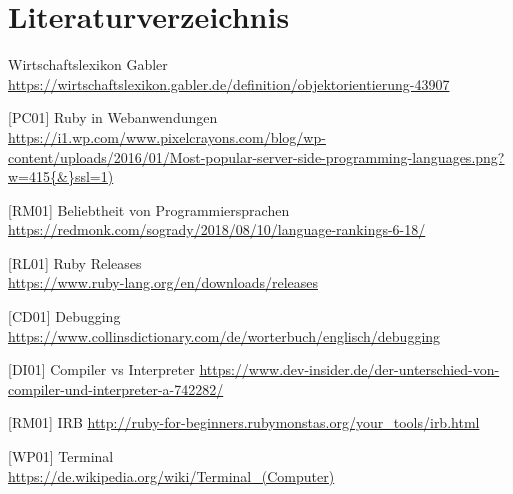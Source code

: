 \documentclass[12pt,DIV=14, version=first, BCOR=10mm,a4paper,twoside,parskip=half-,headsepline,headinclude]{scrartcl}
\begin{document}
\section{Literaturverzeichnis}
\begin{flushleft}
[WL01] Wirtschaftslexikon Gabler
\url {https://wirtschaftslexikon.gabler.de/definition/objektorientierung-43907}


[PC01] Ruby in Webanwendungen
\url {https://i1.wp.com/www.pixelcrayons.com/blog/wp-content/uploads/2016/01/Most-popular-server-side-programming-languages.png?w=415{\&}ssl=1)}


[RM01] Beliebtheit von Programmiersprachen
\url {https://redmonk.com/sogrady/2018/08/10/language-rankings-6-18/}


[RL01] Ruby Releases\\
\url {https://www.ruby-lang.org/en/downloads/releases}

[CD01] Debugging
\url {https://www.collinsdictionary.com/de/worterbuch/englisch/debugging}

[DI01] Compiler vs Interpreter
\url {https://www.dev-insider.de/der-unterschied-von-compiler-und-interpreter-a-742282/}

[RM01] IRB
\url {http://ruby-for-beginners.rubymonstas.org/your_tools/irb.html}

[WP01] Terminal \\
\url {https://de.wikipedia.org/wiki/Terminal_(Computer)}
\end{flushleft}


%
\end{document}
